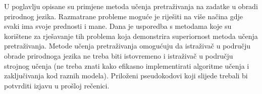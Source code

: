 U poglavlju opisane su primjene metoda učenja pretraživanja na zadatke u obradi
prirodnog jezika. Razmatrane probleme moguće je riješiti na više načina gdje
svaki ima svoje prednosti i mane. Dana je usporedba s metodama koje su korištene
za rješavanje tih problema koja demonstrira superiornost metoda učenja
pretraživanja. Metode učenja pretraživanja omogućuju da istraživač u području
obrade prirodnoga jezika ne treba biti istovremeno i istraživač u području
strojnog učenja (ne treba znati kako efikasno implementirati algoritme učenja i
zaključivanja kod raznih modela). Priloženi pseudokodovi koji slijede trebali bi
potvrditi izjavu u prošloj rečenici.
